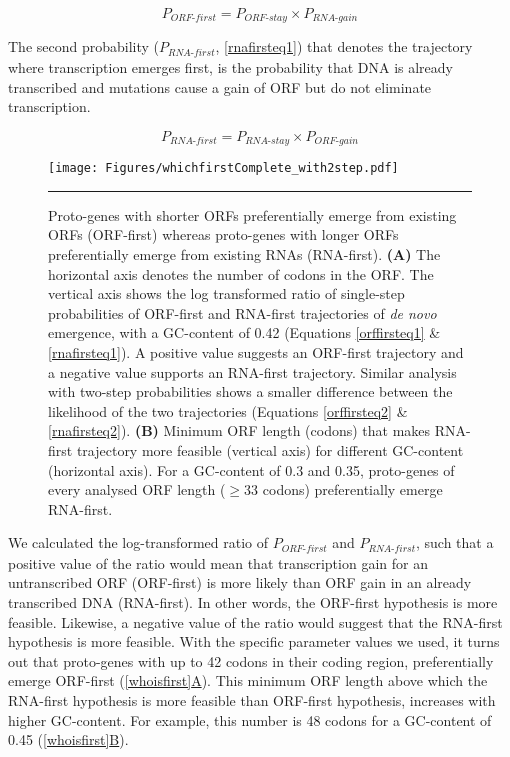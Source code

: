 \documentclass[12pt,a4paper]{article}
\begin{document}
\begin{equation}
P_\textit{ORF-first} = P_\textit{ORF-stay}\times P_\textit{RNA-gain}
\label{orffirsteq1}
\end{equation}

The second probability ($P_\textit{RNA-first}$, \autoref{rnafirsteq1}) that denotes the trajectory where transcription emerges first, is the probability that DNA is already transcribed and mutations cause a gain of ORF but do not eliminate transcription. 

\begin{equation}
P_\textit{RNA-first} = P_\textit{RNA-stay}\times P_\textit{ORF-gain}
\label{rnafirsteq1}
\end{equation}

\begin{figure}[!t]
\centering
\texttt{[image: Figures/whichfirstComplete\_with2step.pdf]}
\caption{Proto-genes with shorter ORFs preferentially emerge from existing ORFs (ORF-first) whereas proto-genes with longer ORFs preferentially emerge from existing RNAs (RNA-first). \textbf{(A)} The horizontal axis denotes the number of codons in the ORF. The vertical axis shows the log transformed ratio of single-step probabilities of ORF-first and RNA-first trajectories of \textit{de novo} emergence, with a GC-content of 0.42 (Equations \ref{orffirsteq1} \& \ref{rnafirsteq1}). A positive value suggests an ORF-first trajectory and a negative value supports an RNA-first trajectory. Similar analysis with two-step probabilities shows a smaller difference between the likelihood of the two trajectories (Equations \ref{orffirsteq2} \& \ref{rnafirsteq2}). \textbf{(B)} Minimum ORF length (codons) that makes RNA-first trajectory more feasible (vertical axis) for different GC-content (horizontal axis). For a GC-content of 0.3 and 0.35, proto-genes of every analysed ORF length ($\geq33$ codons) preferentially emerge RNA-first.}
\label{whoisfirst}
\vspace{1ex}
\hrule
\end{figure}
We calculated the log-transformed ratio of $P_\textit{ORF-first}$ and $P_\textit{RNA-first}$, such that a positive value of the ratio would mean that transcription gain for an untranscribed ORF (ORF-first) is more likely than ORF gain in an already transcribed DNA (RNA-first). In other words, the ORF-first hypothesis is more feasible. Likewise, a negative value of the ratio would suggest that the RNA-first hypothesis is more feasible. With the specific parameter values we used, it turns out that proto-genes with up to 42 codons in their coding region, preferentially emerge ORF-first (\hyperref[whoisfirst]{\autoref{whoisfirst}A}). This minimum ORF length above which the RNA-first hypothesis is more feasible than ORF-first hypothesis, increases with higher GC-content. For example, this number is 48 codons for a GC-content of 0.45 (\hyperref[whoisfirst]{\autoref{whoisfirst}B}).
\end{document}
